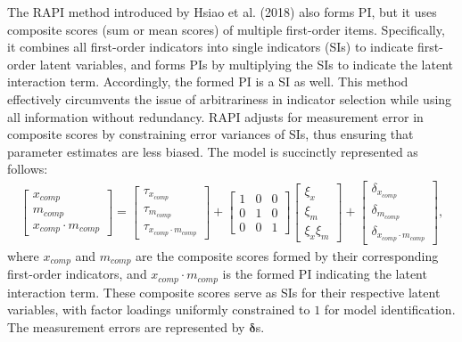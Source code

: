 \documentclass[
  man]{apa6}
\begin{document}
The RAPI method introduced by Hsiao et al. (2018) also forms PI, but it uses composite scores (sum or mean scores) of multiple first-order items. Specifically, it combines all first-order indicators into single indicators (SIs) to indicate first-order latent variables, and forms PIs by multiplying the SIs to indicate the latent interaction term. Accordingly, the formed PI is a SI as well. This method effectively circumvents the issue of arbitrariness in indicator selection while using all information without redundancy. RAPI adjusts for measurement error in composite scores by constraining error variances of SIs, thus ensuring that parameter estimates are less biased. The model is succinctly represented as follows:
\begin{align}
    \begin{bmatrix}
        x_{comp} \\
        m_{comp} \\
        x_{comp} \cdot m_{comp}
    \end{bmatrix} = 
    \begin{bmatrix}
        \tau_{x_{comp}} \\
        \tau_{m_{comp}} \\ 
        \tau_{x_{comp} \cdot m_{comp}} 
    \end{bmatrix} + 
    \begin{bmatrix}
        1 & 0 & 0 \\
        0 & 1 & 0 \\ 
        0 & 0 & 1 
    \end{bmatrix}
    \begin{bmatrix}
        \xi_{x} \\  
        \xi_{m} \\ 
        \xi_{x}\xi_{m}
    \end{bmatrix} +
    \begin{bmatrix}
        \delta_{x_{comp}} \\
        \delta_{m_{comp}} \\ 
        \delta_{x_{comp} \cdot m_{comp}}
    \end{bmatrix},
\end{align}
where \(x_{comp}\) and \(m_{comp}\) are the composite scores formed by their corresponding first-order indicators, and \(x_{comp} \cdot m_{comp}\) is the formed PI indicating the latent interaction term. These composite scores serve as SIs for their respective latent variables, with factor loadings uniformly constrained to \(1\) for model identification. The measurement errors are represented by \(\mathbf{\delta}\)s.
\end{document}
